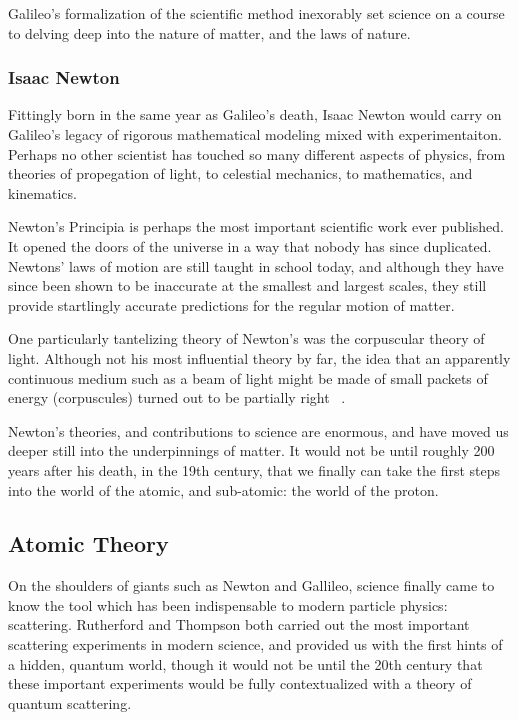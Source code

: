 Galileo's formalization of the scientific method inexorably set science on a
course to delving deep into the nature of matter, and the laws of nature.

\subsubsection{Isaac Newton}
Fittingly born in the same year as Galileo's death, Isaac Newton would carry on
Galileo's legacy of rigorous mathematical modeling mixed with experimentaiton.
Perhaps no other scientist has touched so many different aspects of physics,
from theories of propegation of light, to celestial mechanics, to mathematics,
and kinematics.

Newton's Principia is perhaps the most important scientific work ever published.
It opened the doors of the universe in a way that nobody has since duplicated.
Newtons' laws of motion are still taught in school today, and although they have
since been shown to be inaccurate at the smallest and largest scales, they still
provide startlingly accurate predictions for the regular motion of matter.

One particularly tantelizing theory of Newton's was the corpuscular theory of
light. Although not his most influential theory by far, the idea that an
apparently continuous medium such as a beam of light might be made of small
packets of energy (corpuscules) turned out to be partially right ~\needcite{}.

Newton's theories, and contributions to science are enormous, and have moved us
deeper still into the underpinnings of matter. It would not be until roughly 200
years after his death, in the 19th century, that we finally can take the first
steps into the world of the atomic, and sub-atomic: the world of the proton. 

\subsection{Atomic Theory}

On the shoulders of giants such as Newton and Gallileo, science finally came to
know the tool which has been indispensable to modern particle physics:
scattering. Rutherford and Thompson both carried out the most important
scattering experiments in modern science, and provided us with the first hints
of a hidden, quantum world, though it would not be until the 20th century that
these important experiments would be fully contextualized with a theory of
quantum scattering.

